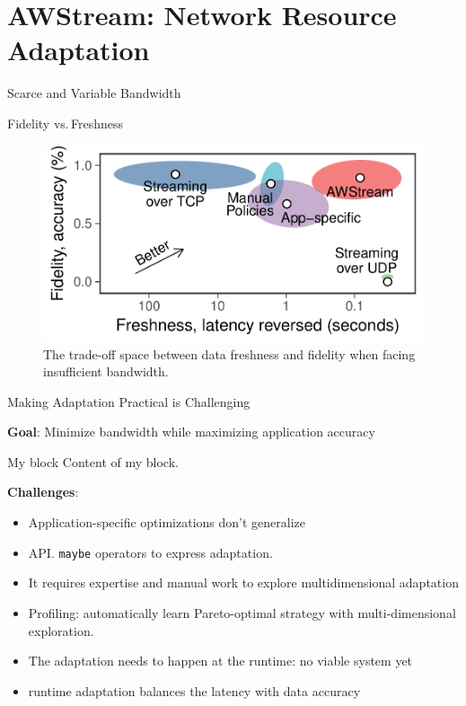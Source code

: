 \section{AWStream: Network Resource Adaptation}

\begin{frame}{Scarce and Variable Bandwidth}

\end{frame}

\begin{frame}{Fidelity vs.\,Freshness}
  \vspace{2em}
  \begin{figure}
    \centering
    \includegraphics[width=0.8\columnwidth]{figures/fidelity-freshness.pdf}
    \caption{The trade-off space between data freshness and fidelity when facing
      insufficient bandwidth.}
  \end{figure}
\end{frame}



\begin{frame}{Making Adaptation Practical is Challenging}

  \textbf{Goal}: Minimize bandwidth while maximizing application accuracy

  \begin{block}{My block}
    Content of my block.
  \end{block}

  \textbf{Challenges}:
  \begin{itemize}
  \item Application-specific optimizations don't generalize
  \item API. \texttt{maybe} operators to express adaptation.
  \item It requires expertise and manual work to explore multidimensional
    adaptation
  \item Profiling: automatically learn Pareto-optimal strategy with
    multi-dimensional exploration.
  \item The adaptation needs to happen at the runtime: no viable system yet
  \item runtime adaptation balances the latency with data accuracy
  \end{itemize}
\end{frame}

